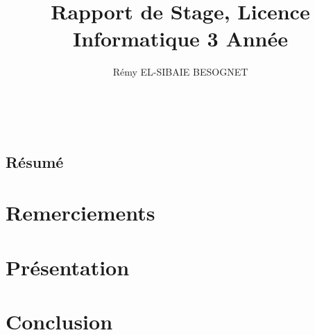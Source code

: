 \documentclass[a4paper]{article}
\title{Rapport de Stage, Licence Informatique 3\up{ème} Année}
\author{Rémy \textsc{EL-SIBAIE BESOGNET}}
\begin{document}


~
\vfill

\begin{center}
\section*{Résumé}
\end{center}

\vfill




\newpage
\section*{Remerciements}



\newpage
\tableofcontents
\newpage
\listoffigures

\newpage
\section{Présentation}

\cite{MAPA2013}

\cite{SeBe2014}

\cite{Balat2013}

\cite{CaChBo2013}

\cite{CaChVo2012}

\cite{Canou}


\newpage
\section{Conclusion}



\newpage
{}


\end{document}
